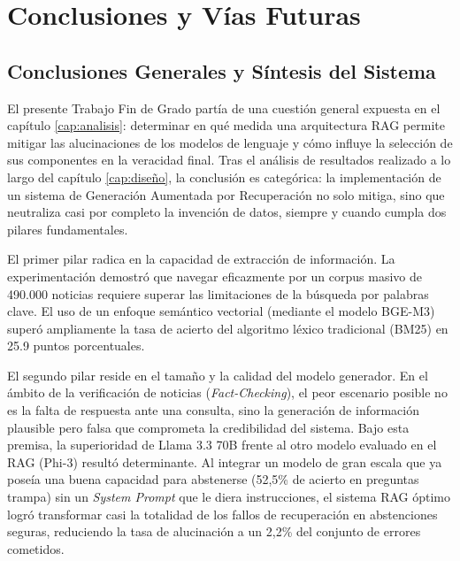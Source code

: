 

\chapter{Conclusiones y Vías Futuras}

\section{Conclusiones Generales y Síntesis del Sistema}

El presente Trabajo Fin de Grado partía de una cuestión general expuesta en el capítulo \ref{cap:analisis}: determinar en qué medida una arquitectura RAG permite mitigar las alucinaciones de los modelos de lenguaje y cómo influye la selección de sus componentes en la veracidad final. Tras el análisis de resultados realizado a lo largo del capítulo \ref{cap:diseño}, la conclusión es categórica: la implementación de un sistema de Generación Aumentada por Recuperación no solo mitiga, sino que neutraliza casi por completo la invención de datos, siempre y cuando cumpla dos pilares fundamentales.

El primer pilar radica en la capacidad de extracción de información. La experimentación demostró que navegar eficazmente por un corpus masivo de 490.000 noticias requiere superar las limitaciones de la búsqueda por palabras clave. El uso de un enfoque semántico vectorial (mediante el modelo BGE-M3) superó ampliamente la tasa de acierto del algoritmo léxico tradicional (BM25) en 25.9 puntos porcentuales.

El segundo pilar reside en el tamaño y la calidad del modelo generador. En el ámbito de la verificación de noticias (\textit{Fact-Checking}), el peor escenario posible no es la falta de respuesta ante una consulta, sino la generación de información plausible pero falsa que comprometa la credibilidad del sistema. Bajo esta premisa, la superioridad de Llama 3.3 70B frente al otro modelo evaluado en el RAG (Phi-3) resultó determinante. Al integrar un modelo de gran escala que ya poseía una buena capacidad para abstenerse (52,5\% de acierto en preguntas trampa) sin un \textit{System Prompt} que le diera instrucciones, el sistema RAG óptimo logró transformar casi la totalidad de los fallos de recuperación en abstenciones seguras, reduciendo la tasa de alucinación a un 2,2\% del conjunto de errores cometidos. 

